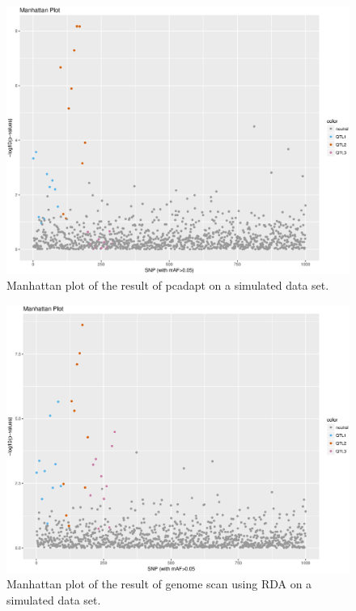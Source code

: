 \documentclass[a4paper,times,10pt,authoryear]{article}%
\begin{document}
\begin{figure}[t]
\begin{center}
\includegraphics[height=0.4\textheight]{figures/sim105_pcadapt.eps}
\end{center}
\caption{Manhattan plot of the result of pcadapt on a simulated data set.}%
\label{fig:pcadapt}%
\end{figure}

\begin{figure}[t]
\begin{center}
\includegraphics[height=0.4\textheight]{figures/sim105_capscale.eps}
\end{center}
\caption{Manhattan plot of the result of genome scan using RDA on a simulated data set.}%
\label{fig:rda}%
\end{figure}
\end{document}
